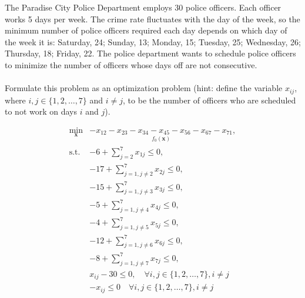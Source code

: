 \begin{homeworkProblem}

    The Paradise City Police Department employs 30 police officers. Each officer 
    works 5 days per week. The crime rate fluctuates with the day of the week, 
    so the minimum number of police officers required each day depends on which 
    day of the week it is: Saturday, 24; Sunday, 13; Monday, 15; Tuesday, 25; 
    Wednesday, 26; Thursday, 18; Friday, 22. The police department wants to 
    schedule police officers to minimize the number of officers whose days off 
    are not consecutive.
    \\ \\
    Formulate this problem as an optimization problem (hint: define the variable 
    $x_{ij}$, where $i, j \in \{1, 2, \ldots, 7\}$ and $i\neq j$, to be the number 
    of officers who are scheduled to not work on days $i$ and $j$).
    \\

    \begin{solution}
        \[
            \begin{array}{rl}
                \min\limits_{\boldsymbol{x}} & \underset{f_0(\boldsymbol{x})}{\boxed{-x_{12} - x_{23} - x_{34} - x_{45} - x_{56} - x_{67} - x_{71}}}, \\ [3ex]
                \text{s.t.} &  - 6 + \sum_{j=2}^{7} x_{1j} \leq 0, \\ [3ex]
                            & -17 + \sum_{j=1, j \neq 2}^{7} x_{2j} \leq 0, \\ [3ex]
                            & - 15 + \sum_{j=1, j \neq 3}^{7} x_{3j} \leq 0, \\ [3ex]
                            & -5 + \sum_{j=1, j \neq 4}^{7} x_{4j} \leq 0, \\ [3ex]
                            & -4 + \sum_{j=1, j \neq 5}^{7} x_{5j} \leq 0, \\ [3ex]
                            & -12 + \sum_{j=1, j \neq 6}^{7} x_{6j} \leq 0, \\ [3ex]
                            & -8 + \sum_{j=1, j \neq 7}^{7} x_{7j} \leq 0, \\ [3ex]
                            & x_{ij} - 30 \leq 0, \quad \forall i,j \in \{1, 2, \ldots, 7\}, i \neq j \\ [3ex]
                            & - x_{ij} \leq 0 \quad \forall i,j \in \{1, 2, \ldots, 7\}, i \neq j


\end{array}\]
\end{solution}
\end{homeworkProblem}
